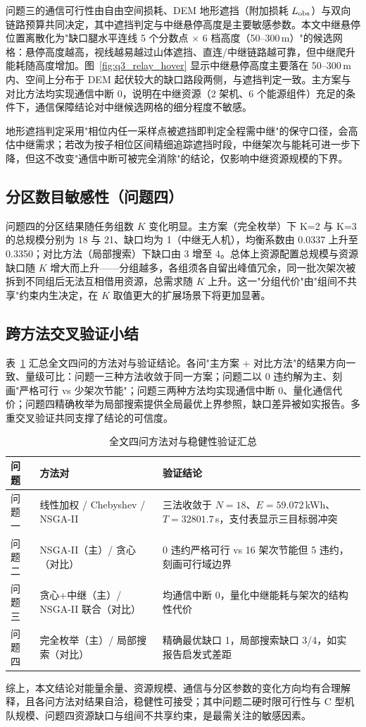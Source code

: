问题三的通信可行性由自由空间损耗、DEM 地形遮挡（附加损耗 $L_{\rm obs}$）与双向链路预算共同决定，其中遮挡判定与中继悬停高度是主要敏感参数。本文中继悬停位置离散化为"缺口腿水平连线 5 个分数点 $\times$ 6 档高度（50--300\,m）"的候选网格：悬停高度越高，视线越易越过山体遮挡、直连/中继链路越可靠，但中继爬升能耗随高度增加。图~\ref{fig:q3_relay_hover} 显示中继悬停高度主要落在 50--300\,m 内、空间上分布于 DEM 起伏较大的缺口路段两侧，与遮挡判定一致。主方案与对比方法均实现通信中断 0，说明在中继资源（2 架机、6 个能源组件）充足的条件下，通信保障结论对中继候选网格的细分程度不敏感。

地形遮挡判定采用"相位内任一采样点被遮挡即判定全程需中继"的保守口径，会高估中继需求；若改为按子相位区间精细追踪遮挡时段，中继架次与能耗可进一步下降，但这不改变"通信中断可被完全消除"的结论，仅影响中继资源规模的下界。

\subsection{分区数目敏感性（问题四）}

问题四的分区结果随任务组数 $K$ 变化明显。主方案（完全枚举）下 K=2 与 K=3 的总规模分别为 18 与 21、缺口均为 1（中继无人机），均衡系数由 0.0337 上升至 0.3350；对比方法（局部搜索）下缺口由 3 增至 4。总体上资源配置总规模与资源缺口随 $K$ 增大而上升——分组越多，各组须各自留出峰值冗余，同一批次架次被拆到不同组后无法互相借用资源，总需求随 $K$ 上升。这一"分组代价"由"组间不共享"约束内生决定，在 $K$ 取值更大的扩展场景下将更加显著。

\subsection{跨方法交叉验证小结}

表~\ref{tab:robust} 汇总全文四问的方法对与验证结论。各问"主方案 + 对比方法"的结果方向一致、量级可比：问题一三种方法收敛于同一方案；问题二以 0 违约解为主、刻画"严格可行 vs 少架次节能"；问题三两种方法均实现通信中断 0、量化通信代价；问题四精确枚举为局部搜索提供全局最优上界参照，缺口差异被如实报告。多重交叉验证共同支撑了结论的可信度。

\begin{table}[htbp]
\centering
\caption{全文四问方法对与稳健性验证汇总}
\label{tab:robust}
\small
\begin{tabular}{llp{8.5cm}}
\toprule
\textbf{问题} & \textbf{方法对} & \textbf{验证结论} \\
\midrule
问题一 & 线性加权 / Chebyshev / NSGA-II & 三法收敛于 $N=18$、$E=59.072$\,kWh、$T=32801.7$\,s，支付表显示三目标弱冲突 \\
问题二 & NSGA-II（主）/ 贪心（对比） & 0 违约严格可行 vs 16 架次节能但 5 违约，刻画可行域边界 \\
问题三 & 贪心+中继（主）/ NSGA-II 联合（对比） & 均通信中断 0，量化中继能耗与架次的结构性代价 \\
问题四 & 完全枚举（主）/ 局部搜索（对比） & 精确最优缺口 1，局部搜索缺口 3/4，如实报告启发式差距 \\
\bottomrule
\end{tabular}
\end{table}

综上，本文结论对能量余量、资源规模、通信与分区参数的变化方向均有合理解释，且各问方法对结果自洽，稳健性可接受；其中问题二硬时限可行性与 C 型机队规模、问题四资源缺口与组间不共享约束，是最需关注的敏感因素。
